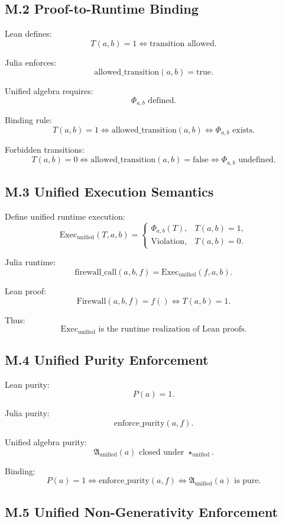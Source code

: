\subsection*{M.2 Proof-to-Runtime Binding}

Lean defines:
\[
T(a,b)=1 \iff \text{transition allowed}.
\]

Julia enforces:
\[
\mathrm{allowed\_transition}(a,b)=\mathrm{true}.
\]

Unified algebra requires:
\[
\Phi_{a,b} \text{ defined}.
\]

Binding rule:
\[
T(a,b)=1
\iff
\mathrm{allowed\_transition}(a,b)
\iff
\Phi_{a,b} \text{ exists}.
\]

Forbidden transitions:
\[
T(a,b)=0
\iff
\mathrm{allowed\_transition}(a,b)=\mathrm{false}
\iff
\Phi_{a,b} \text{ undefined}.
\]

\subsection*{M.3 Unified Execution Semantics}

Define unified runtime execution:
\[
\mathrm{Exec}_{\mathrm{unified}}(T,a,b)
=
\begin{cases}
\Phi_{a,b}(T), & T(a,b)=1, \\
\mathrm{Violation}, & T(a,b)=0.
\end{cases}
\]

Julia runtime:
\[
\mathrm{firewall\_call}(a,b,f)
=
\mathrm{Exec}_{\mathrm{unified}}(f,a,b).
\]

Lean proof:
\[
\mathrm{Firewall}(a,b,f)=f()
\iff
T(a,b)=1.
\]

Thus:
\[
\mathrm{Exec}_{\mathrm{unified}}
\text{ is the runtime realization of Lean proofs}.
\]

\subsection*{M.4 Unified Purity Enforcement}

Lean purity:
\[
P(a)=1.
\]

Julia purity:
\[
\mathrm{enforce\_purity}(a,f).
\]

Unified algebra purity:
\[
\mathfrak{A}_{\mathrm{unified}}(a)
\text{ closed under }
\star_{\mathrm{unified}}.
\]

Binding:
\[
P(a)=1
\iff
\mathrm{enforce\_purity}(a,f)
\iff
\mathfrak{A}_{\mathrm{unified}}(a)
\text{ is pure}.
\]

\subsection*{M.5 Unified Non-Generativity Enforcement}

